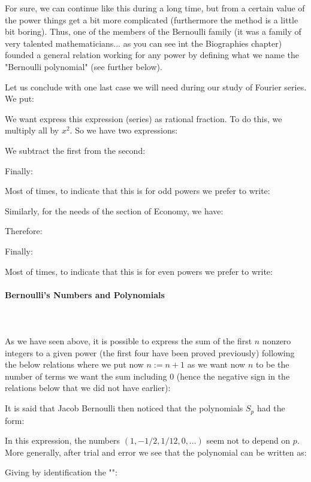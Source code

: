 	For sure, we can continue like this during a long time, but from a certain value of the power things get a bit more complicated (furthermore the method is a little bit boring). Thus, one of the members of the Bernoulli family (it was a family of very talented mathematicians... as you can see int the Biographies chapter) founded a general relation working for any power by defining what we name the "Bernoulli polynomial" (see further below).
	
	Let us conclude with one last case we will need during our study of Fourier series. We put:
	
	We want express this expression (series) as rational fraction. To do this, we multiply all by $x^2$. So we have two expressions:
	
	We subtract the first from the second:
	
	Finally:
	
	Most of times, to indicate that this is for odd powers we prefer to write:
	
	Similarly, for the needs of the section of Economy, we have:
	
	Therefore:
	
	Finally:
	
	Most of times, to indicate that this is for even powers we prefer to write:
	
	\paragraph{Bernoulli's Numbers and Polynomials}\mbox{}\\\\
	As we have seen above, it is possible to express the sum of the first $n$ nonzero integers to a given power (the first four have been proved previously) following the below relations where we put now $n:=n+1$ as we want now $n$ to be the number of terms we want the sum including 0 (hence the negative sign in the relations below that we did not have earlier):
	
	It is said that Jacob Bernoulli  then noticed that the polynomials $S_p$ had the form:
	
	In this expression, the numbers $(1,-1/2,1/12,0,...)$ seem not to depend on $p$. More generally, after trial and error we see that the polynomial can be written as:
	
	Giving by identification the "":
	
